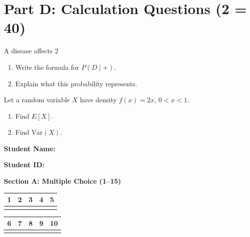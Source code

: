 \documentclass{USTBExam}
\begin{document}
\section{Part D: Calculation Questions (2  = 40)}

\begin{problem}
A disease affects 2%
\begin{enumerate}
\item Write the formula for $P(D\mid +)$.
\item Explain what this probability represents.
\end{enumerate}
\end{problem}

\begin{problem}
Let a random variable $X$ have density $f(x)=2x$, $0<x<1$.
\begin{enumerate}
\item Find $E[X]$.
\item Find $\mathrm{Var}(X)$.
\end{enumerate}
\end{problem}




\newpage

\noindent\textbf{Student Name:} \underline{\hspace{6cm}}

\textbf{Student ID:} \underline{\hspace{6cm}}

\vspace{0.6cm}
\noindent\textbf{Section A: Multiple Choice (1--15)}\\[0.2cm]
\noindent
\begin{tabular}{|c|c|c|c|c|}
\hline
1 & 2 & 3 & 4 & 5  \\
\hline
\underline{\hspace{1.6cm}} & \underline{\hspace{1.6cm}} & \underline{\hspace{1.6cm}} & \underline{\hspace{1.6cm}} & \underline{\hspace{1.6cm}}  \\
\hline
\end{tabular}

\begin{tabular}{|c|c|c|c|c|}
\hline
6 & 7 & 8 & 9 & 10  \\
\hline
\underline{\hspace{1.6cm}} & \underline{\hspace{1.6cm}} & \underline{\hspace{1.6cm}} & \underline{\hspace{1.6cm}} & \underline{\hspace{1.6cm}}  \\
\hline
\end{tabular}
\end{document}
